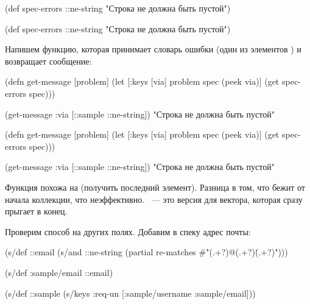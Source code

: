 \label{spec-errors}

\ifnarrow

\begin{clojure}
(def spec-errors
  {::ne-string
   "Строка не должна быть пустой"})
\end{clojure}

\else


\begin{clojure}
(def spec-errors
  {::ne-string "Строка не должна быть пустой"})
\end{clojure}
\fi

Напишем функцию, которая принимает словарь ошибки (один из элементов
) и возвращает сообщение:


\pagebreakafive

\ifnarrow

\begin{clojure}
(defn get-message [problem]
  (let [{:keys [via]} problem
        spec (peek via)]
    (get spec-errors spec)))

(get-message {:via [::sample
                    ::ne-string]})
"Строка не должна быть пустой"
\end{clojure}

\else

\begin{clojure}
(defn get-message [problem]
  (let [{:keys [via]} problem
        spec (peek via)]
    (get spec-errors spec)))

(get-message {:via [::sample ::ne-string]})
"Строка не должна быть пустой"
\end{clojure}

\fi

Функция  похожа на  (получить последний
элемент). Разница в том, что  бежит от начала коллекции, что
неэффективно. ~--- это версия  для вектора, которая сразу
прыгает в конец.

Проверим способ на других полях. Добавим в спеку  адрес почты:


\ifnarrow

\begin{clojure}
(s/def ::email
  (s/and
    ::ne-string
    (partial re-matches
      #"(.+?)@(.+?)\.(.+?)")))

(s/def :sample/email ::email)

(s/def ::sample
  (s/keys :req-un [:sample/username
                   :sample/email]))
\end{clojure}

